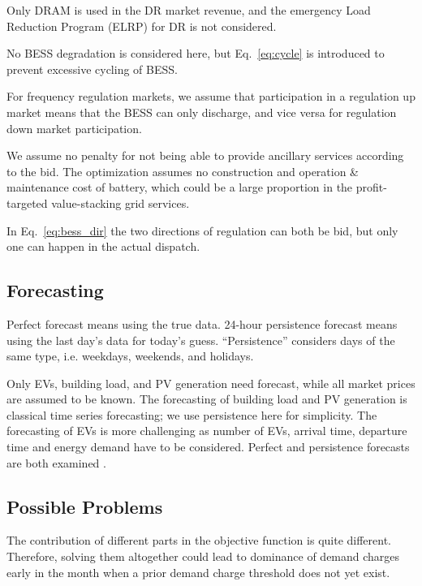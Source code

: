 \documentclass[conference]{IEEEtran}
\begin{document}
Only DRAM is used in the DR market revenue, and the emergency Load Reduction Program (ELRP) for DR is not considered.

No BESS degradation is considered here, but Eq.~\ref{eq:cycle} is introduced to prevent excessive cycling of BESS.

For frequency regulation markets, we assume that participation in a regulation up market means that the BESS can only discharge, and vice versa for regulation down market participation.

We assume no penalty for not being able to provide ancillary services according to the bid. The optimization assumes no construction and operation \& maintenance cost of battery, which could be a large proportion in the profit-targeted value-stacking grid services.


In Eq.~\ref{eq:bess_dir} the two directions of regulation can both be bid, but only one can happen in the actual dispatch.


\subsection{Forecasting}
Perfect forecast means using the true data. 24-hour persistence forecast means using the last day's data for today's guess. ``Persistence'' considers days of the same type, i.e. weekdays, weekends, and holidays.

Only EVs, building load, and PV generation need forecast, while all market prices are assumed to be known. The forecasting of building load and PV generation is classical time series forecasting; we use persistence here for simplicity. The forecasting of EVs is more challenging as number of EVs, arrival time, departure time and energy demand have to be considered. Perfect and persistence forecasts are both examined . 

\subsection{Possible Problems}
The contribution of different parts in the objective function is quite different. Therefore, solving them altogether could lead to dominance of demand charges early in the month when a prior demand charge threshold does not yet exist. %
\end{document}
